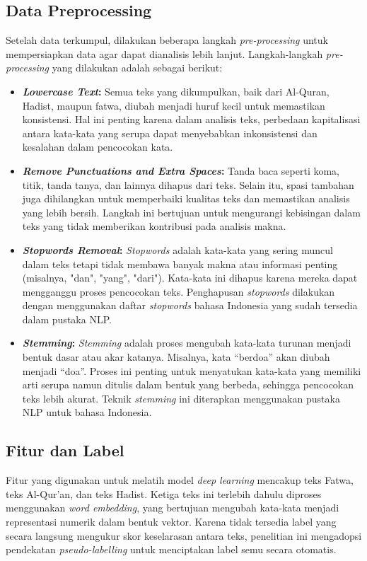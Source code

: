 \documentclass[12pt,a4paper]{article}
\begin{document}
\newpage
\subsection{Data Preprocessing}

Setelah data terkumpul, dilakukan beberapa langkah \textit{pre-processing} untuk mempersiapkan data agar dapat dianalisis lebih lanjut. Langkah-langkah \textit{pre-processing} yang dilakukan adalah sebagai berikut:

\begin{itemize}
    \item \textbf{\textit{Lowercase Text}:} Semua teks yang dikumpulkan, baik dari Al-Quran, Hadist, maupun fatwa, diubah menjadi huruf kecil untuk memastikan konsistensi. Hal ini penting karena dalam analisis teks, perbedaan kapitalisasi antara kata-kata yang serupa dapat menyebabkan inkonsistensi dan kesalahan dalam pencocokan kata.
    
    \item \textbf{\textit{Remove Punctuations and Extra Spaces}:} Tanda baca seperti koma, titik, tanda tanya, dan lainnya dihapus dari teks. Selain itu, spasi tambahan juga dihilangkan untuk memperbaiki kualitas teks dan memastikan analisis yang lebih bersih. Langkah ini bertujuan untuk mengurangi kebisingan dalam teks yang tidak memberikan kontribusi pada analisis makna.

    \item \textbf{\textit{Stopwords Removal}:} \textit{Stopwords} adalah kata-kata yang sering muncul dalam teks tetapi tidak membawa banyak makna atau informasi penting (misalnya, "dan", "yang", "dari"). Kata-kata ini dihapus karena mereka dapat mengganggu proses pencocokan teks. Penghapusan \textit{stopwords} dilakukan dengan menggunakan daftar\textit{ stopwords} bahasa Indonesia yang sudah tersedia dalam pustaka NLP.

    \item \textbf{\textit{Stemming}:}\textit{ Stemming} adalah proses mengubah kata-kata turunan menjadi bentuk dasar atau akar katanya. Misalnya, kata “berdoa” akan diubah menjadi “doa”. Proses ini penting untuk menyatukan kata-kata yang memiliki arti serupa namun ditulis dalam bentuk yang berbeda, sehingga pencocokan teks lebih akurat. Teknik \textit{stemming} ini diterapkan menggunakan pustaka NLP untuk bahasa Indonesia.
\end{itemize}

\subsection{Fitur dan Label}
Fitur yang digunakan untuk melatih model \textit{deep learning} mencakup teks Fatwa, teks Al-Qur'an, dan teks Hadist. Ketiga teks ini terlebih dahulu diproses menggunakan \textit{word embedding}, yang bertujuan mengubah kata-kata menjadi representasi numerik dalam bentuk vektor. Karena tidak tersedia label yang secara langsung mengukur skor keselarasan antara teks, penelitian ini mengadopsi pendekatan \textit{pseudo-labelling} untuk menciptakan label semu secara otomatis.
\end{document}
